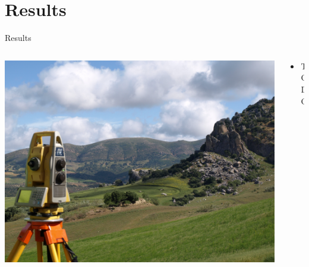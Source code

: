 
\section{Results}
\begin{frame}{Results}
	\begin{columns}[T] %
		\begin{column}{.48\textwidth}
			\includegraphics[width=\linewidth]{images/background}
		\end{column}%
		\hfill%
		\begin{column}{.56\textwidth}
			\begin{itemize}
				\item TODO
			\end{itemize}
		\end{column}%
	\end{columns}
	
\end{frame}